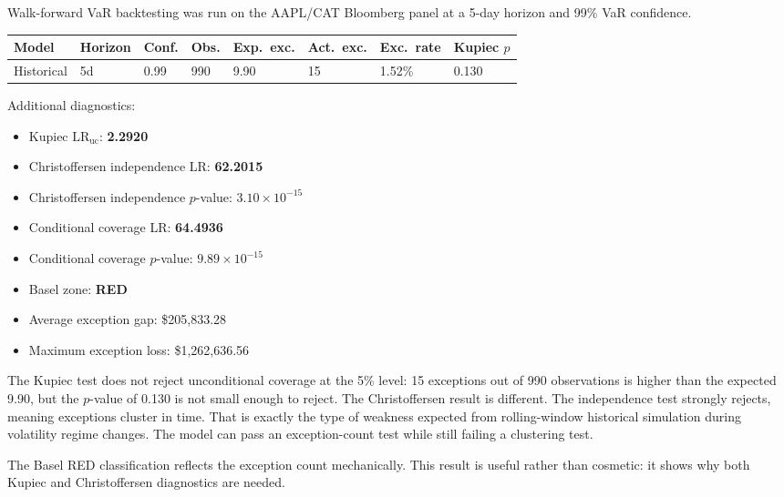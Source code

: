 \documentclass[11pt]{article}
\begin{document}
Walk-forward VaR backtesting was run on the AAPL/CAT Bloomberg panel at a
5-day horizon and 99\% VaR confidence.

\begin{center}
\small
\begin{tabular}{L{2.2cm}L{1.5cm}L{1.3cm}L{1.2cm}L{1.5cm}L{1.5cm}L{1.5cm}L{1.5cm}}
\toprule
\textbf{Model} & \textbf{Horizon} & \textbf{Conf.} & \textbf{Obs.} & \textbf{Exp.\ exc.} & \textbf{Act.\ exc.} & \textbf{Exc.\ rate} & \textbf{Kupiec $p$} \\
\midrule
Historical & 5d & 0.99 & 990 & 9.90 & 15 & 1.52\% & 0.130 \\
\bottomrule
\end{tabular}
\end{center}

Additional diagnostics:
\begin{itemize}
  \item Kupiec $\mathrm{LR}_{\mathrm{uc}}$: \textbf{2.2920}
  \item Christoffersen independence LR: \textbf{62.2015}
  \item Christoffersen independence $p$-value: $3.10 \times 10^{-15}$
  \item Conditional coverage LR: \textbf{64.4936}
  \item Conditional coverage $p$-value: $9.89 \times 10^{-15}$
  \item Basel zone: \textbf{RED}
  \item Average exception gap: \$205{,}833.28
  \item Maximum exception loss: \$1{,}262{,}636.56
\end{itemize}

The Kupiec test does not reject unconditional coverage at the 5\% level:
15 exceptions out of 990 observations is higher than the expected 9.90,
but the $p$-value of 0.130 is not small enough to reject.  The
Christoffersen result is different.  The independence test strongly
rejects, meaning exceptions cluster in time.  That is exactly the type
of weakness expected from rolling-window historical simulation during
volatility regime changes.  The model can pass an exception-count test
while still failing a clustering test.

The Basel RED classification reflects the exception count mechanically.
This result is useful rather than cosmetic: it shows why both Kupiec and
Christoffersen diagnostics are needed.

\end{document}
